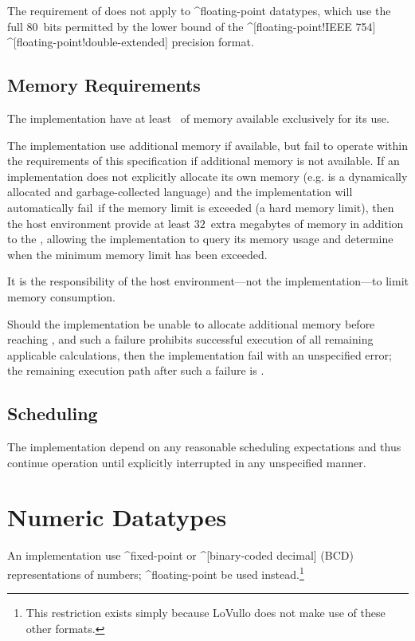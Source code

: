 The requirement of  does not apply to ^floating-point datatypes,
which \may use the full 80~bits permitted by the lower bound of the
^[floating-point!IEEE 754] ^[floating-point!double-extended] precision format.


\subsection{Memory Requirements}
The implementation \shall have at least \minmem\ of memory available
exclusively for its use.

The implementation \may use additional memory if available, but \shallnot fail
to operate within the requirements of this specification if additional memory is
not available. If an implementation does not explicitly allocate its own memory
(e.g. is a dynamically allocated and garbage-collected language) and the
implementation will automatically fail\footnotemark\ if the memory limit is
exceeded (a hard memory limit), then the host environment \shall provide at
least $32$~extra megabytes of memory in addition to the \minmem, allowing the
implementation to query its memory usage and determine when the minimum memory
limit has been exceeded.

It is the responsibility of the host environment---not the implementation---to
limit memory consumption.

Should the implementation be unable to allocate additional memory before reaching
\minmem, and such a failure prohibits successful execution of all remaining
applicable calculations, then the implementation \shall fail with an unspecified
error; the remaining execution path after such a failure is \undefined.


\subsection{Scheduling}
The implementation \shallnot depend on any reasonable scheduling expectations
and \shall thus continue operation until explicitly interrupted in any
unspecified manner.


\section{Numeric Datatypes}
An implementation \shallnot use ^fixed-point or ^[binary-coded decimal] (BCD)
representations of numbers; ^floating-point \shall be used
instead.\footnote{This restriction exists simply because LoVullo does not make
use of these other formats.}

